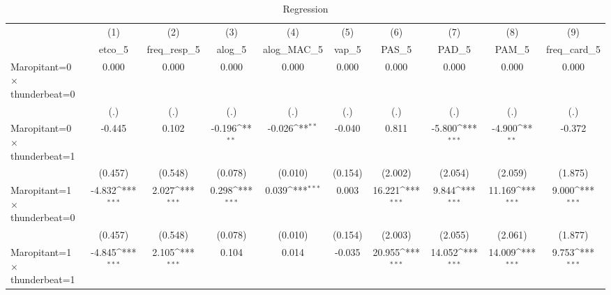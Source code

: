 \begin{table}[htbp]\centering
\def\sym#1{\ifmmode^{#1}\else\(^{#1}\)\fi}
\caption{Regression}
\begin{tabular}{l*{9}{c}}
\toprule
                    &\multicolumn{1}{c}{(1)}&\multicolumn{1}{c}{(2)}&\multicolumn{1}{c}{(3)}&\multicolumn{1}{c}{(4)}&\multicolumn{1}{c}{(5)}&\multicolumn{1}{c}{(6)}&\multicolumn{1}{c}{(7)}&\multicolumn{1}{c}{(8)}&\multicolumn{1}{c}{(9)}\\
                    &\multicolumn{1}{c}{etco\_5}&\multicolumn{1}{c}{freq\_resp\_5}&\multicolumn{1}{c}{alog\_5}&\multicolumn{1}{c}{alog\_MAC\_5}&\multicolumn{1}{c}{vap\_5}&\multicolumn{1}{c}{PAS\_5}&\multicolumn{1}{c}{PAD\_5}&\multicolumn{1}{c}{PAM\_5}&\multicolumn{1}{c}{freq\_card\_5}\\
\midrule
Maropitant=0 $\times$ thunderbeat=0&       0.000         &       0.000         &       0.000         &       0.000         &       0.000         &       0.000         &       0.000         &       0.000         &       0.000         \\
                    &         (.)         &         (.)         &         (.)         &         (.)         &         (.)         &         (.)         &         (.)         &         (.)         &         (.)         \\
\addlinespace
Maropitant=0 $\times$ thunderbeat=1&      -0.445         &       0.102         &      -0.196\sym{**} &      -0.026\sym{**} &      -0.040         &       0.811         &      -5.800\sym{***}&      -4.900\sym{**} &      -0.372         \\
                    &     (0.457)         &     (0.548)         &     (0.078)         &     (0.010)         &     (0.154)         &     (2.002)         &     (2.054)         &     (2.059)         &     (1.875)         \\
\addlinespace
Maropitant=1 $\times$ thunderbeat=0&      -4.832\sym{***}&       2.027\sym{***}&       0.298\sym{***}&       0.039\sym{***}&       0.003         &      16.221\sym{***}&       9.844\sym{***}&      11.169\sym{***}&       9.000\sym{***}\\
                    &     (0.457)         &     (0.548)         &     (0.078)         &     (0.010)         &     (0.154)         &     (2.003)         &     (2.055)         &     (2.061)         &     (1.877)         \\
\addlinespace
Maropitant=1 $\times$ thunderbeat=1&      -4.845\sym{***}&       2.105\sym{***}&       0.104         &       0.014         &      -0.035         &      20.955\sym{***}&      14.052\sym{***}&      14.009\sym{***}&       9.753\sym{***}\\

\end{tabular}
\end{table}
